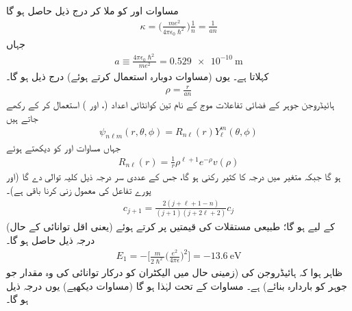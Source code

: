  مساوات  اور  کو ملا کر درج ذیل حاصل ہو گا
\begin{align}
\kappa =\big(\frac{me^{2}}{4\pi\epsilon_{0}\hslash^{2}}\big)\frac{1}{n}=\frac{1}{an} 
\end{align}
جہاں
\begin{align}\label{مساوات_تین_ابعادی_رداس_بوہر}
a\equiv\frac{4\pi\epsilon_{0}\hslash^{2}}{me^{2}}=\SI{0.529e-10}{\meter}
\end{align}
 کہلاتا ہے۔ یوں (مساوات  دوبارہ استعمال کرتے ہوئے) درج ذیل ہو گا۔
\begin{align}
\rho=\frac{r}{an} 
\end{align}
ہائیڈروجن جوہر کے فضائی تفاعلات موج کے نام تین کوانٹائی اعداد (،  اور ) استعمال کر کے رکھے جاتے ہیں 
 \begin{align}
\psi_{n\ell m}(r,\theta,\phi)=R_{n\ell}(r)Y_{\ell}^{m}(\theta,\phi) 
\end{align}
 جہاں مساوات  اور  کو دیکھتے ہوئے
 \begin{align}
R_{n\ell}(r)=\frac{1}{r}\rho^{\ell+1}e^{-\rho}v(\rho) 
\end{align} 
 ہو گا جبکہ  متغیر  میں درجہ  کا کثیر رکنی ہو گا، جس کے عددی سر درجہ ذیل کلیہ توالی دے گا (اور پورے تفاعل کی معمول زنی کرنا باقی ہے)۔
 \begin{align}\label{مساوات_ابعادی_کلیہ_توالی_کولمب_مخفیہ}
c_{j+1}=\frac{2(j+\ell+1-n)}{(j+1)(j+2\ell+2)}c_{j} 
\end{align}
 (یعنی اقل توانائی کے حال) کے لیے 
  ہو گا؛ طبیعی مستقلات کی قیمتیں پر کرتے ہوئے درجہ ذیل حاصل ہو گا۔
 \begin{align}\label{مساوات_تین_ابعاد_ہائیڈروجن_بندشی_توانائی}
E_{1}=-\big[\frac{m}{2\hslash^{2}}\big(\frac{e^{2}}{4\pi\epsilon}\big)^{2}\big]=\SI{-13.6}{\electronvolt}
\end{align}
 ظاہر ہوا کہ ہائیڈروجن کی  (زمینی حال میں الیکٹران کو درکار توانائی کی وہ مقدار جو جوہر کو باردارہ بنائے)  ہے۔ مساوات  کے تحت  لہٰذا  ہو گا (مساوات  دیکھیے) یوں درجہ ذیل ہو گا۔
